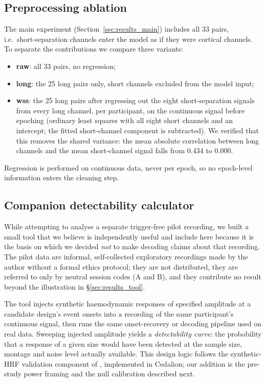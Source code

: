 \subsection{Preprocessing ablation}
\label{sec:methods_ablation}
The main experiment (Section~\ref{sec:results_main}) includes all 33 pairs, i.e.\ short-separation
channels enter the model as if they were cortical channels. To separate the contributions we
compare three variants:
\begin{itemize}
  \item \textbf{raw}: all 33 pairs, no regression;
  \item \textbf{long}: the 25 long pairs only, short channels excluded from the model input;
  \item \textbf{wss}: the 25 long pairs after regressing out the eight short-separation signals
        from every long channel, per participant, on the continuous signal before epoching
        (ordinary least squares with all eight short channels and an intercept; the fitted
        short-channel component is subtracted). We verified that this removes the shared
        variance: the mean absolute correlation between long channels and the mean short-channel
        signal falls from 0.434 to 0.000.
\end{itemize}
Regression is performed on continuous data, never per epoch, so no epoch-level information enters
the cleaning step.

\subsection{Companion detectability calculator}
\label{sec:methods_tool}
While attempting to analyse a separate trigger-free pilot recording, we built a small tool that
we believe is independently useful and include here because it is the basis on which we decided
\emph{not} to make decoding claims about that recording. The pilot data are informal,
self-collected exploratory recordings made by the author without a formal ethics protocol; they
are not distributed, they are referred to only by neutral session codes (A and B), and they
contribute no result beyond the illustration in \S\ref{sec:results_tool}.

The tool injects synthetic haemodynamic responses of specified amplitude at a candidate design's
event onsets into a recording of the same participant's continuous signal, then runs the same
onset-recovery or decoding pipeline used on real data. Sweeping injected amplitude yields a
\emph{detectability curve}: the probability that a response of a given size would have been
detected at the sample size, montage and noise level actually available. This design logic
follows the synthetic-HRF validation component of \citet{fischer2026density}, implemented in
Cedalion; our addition is the pre-study power framing and the null calibration described next.

